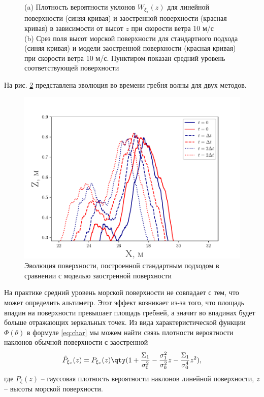 \begin{figure}[h!]
\begin{subfigure}{0.49\linewidth}
        \caption{}
    \end{subfigure}
    \caption{(a) Плотность вероятности уклонов $W_{\xi_x}(z)$ для линейной
        поверхности (синяя кривая) и заостренной поверхности (красная кривая) в
        зависимости от высот $z$ при скорости ветра 10 м/с \\
    (b) Срез поля высот морской поверхности для стандартного подхода (синяя
кривая) и модели заостренной поверхности (красная кривая) при скорости ветра 10
м/с. Пунктиром показан средний уровень соответствующей поверхности}
    \label{fig:pdf}
\end{figure}
На рис. \ref{fig:evolution} представлена эволюция во времени гребня волны для
двух методов. 

\begin{figure}[H]
    \centering
    \includegraphics[width=0.8\linewidth]{fig/evolution}
    \caption{Эволюция поверхности, построенной стандартным подходом в сравнении
    с моделью заостренной поверхности}
    \label{fig:evolution}
\end{figure}



На практике средний уровень морской поверхности не совпадает с тем, что может
определить альтиметр. Этот эффект возникает из-за того, что площадь впадин на
поверхности превышает площадь гребней, а значит во впадинах будет больше
отражающих зеркальных точек. 
Из вида характеристической функции $\Phi(\theta)$ в формуле  \eqref{eq:char} мы
можем найти связь плотности вероятности наклонов обычной поверхности с
заостренной
\begin{equation}
    \tilde P_{\xi_x}(z) = 
    P_{\xi_x}(z)\qty(1 + 
                    \frac{\Sigma_1}{\sigma_0^2} -
                    \frac{\sigma_1^2}{\sigma_0^2} z -
                    \frac{\Sigma_1}{\sigma_0^4}z^2), 
\end{equation}
где $P_\xi(z)$ -- гауссовая плотность вероятности наклонов линейной
поверхности,  $z$ -- высоты морской поверхности.


